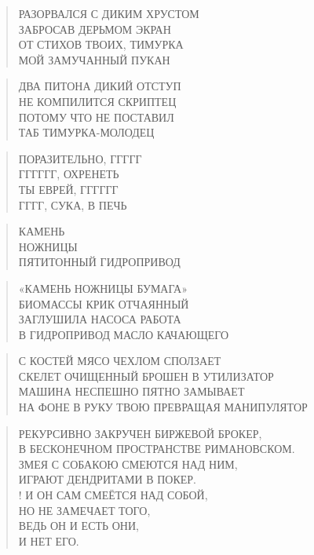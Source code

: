 \poemtitle{***}
\begin{verse}
РАЗОРВАЛСЯ С ДИКИМ ХРУСТОМ\\
ЗАБРОСАВ ДЕРЬМОМ ЭКРАН\\
ОТ СТИХОВ ТВОИХ, ТИМУРКА\\
МОЙ ЗАМУЧАННЫЙ ПУКАН
\end{verse}

\poemtitle{***}
\begin{verse}
ДВА ПИТОНА ДИКИЙ ОТСТУП\\
НЕ КОМПИЛИТСЯ СКРИПТЕЦ\\
ПОТОМУ ЧТО НЕ ПОСТАВИЛ\\
ТАБ ТИМУРКА-МОЛОДЕЦ
\end{verse}

\poemtitle{***}
\begin{verse}
ПОРАЗИТЕЛЬНО, ГГГГГ\\
ГГГГГГ, ОХРЕНЕТЬ\\
ТЫ ЕВРЕЙ, ГГГГГГ\\
ГГГГ, СУКА, В ПЕЧЬ
\end{verse}

\poemtitle{***}
\begin{verse}
КАМЕНЬ\\
НОЖНИЦЫ\\
ПЯТИТОННЫЙ ГИДРОПРИВОД
\end{verse}

\poemtitle{***}
\begin{verse}
«КАМЕНЬ НОЖНИЦЫ БУМАГА»\\
БИОМАССЫ КРИК ОТЧАЯННЫЙ\\
ЗАГЛУШИЛА НАСОСА РАБОТА\\
В ГИДРОПРИВОД МАСЛО КАЧАЮЩЕГО
\end{verse}

\poemtitle{***}
\begin{verse}
С КОСТЕЙ МЯСО ЧЕХЛОМ СПОЛЗАЕТ\\
СКЕЛЕТ ОЧИЩЕННЫЙ БРОШЕН В УТИЛИЗАТОР\\
МАШИНА НЕСПЕШНО ПЯТНО ЗАМЫВАЕТ\\
НА ФОНЕ В РУКУ ТВОЮ ПРЕВРАЩАЯ МАНИПУЛЯТОР
\end{verse}

\poemtitle{***}
\begin{verse}
РЕКУРСИВНО ЗАКРУЧЕН БИРЖЕВОЙ БРОКЕР,\\
В БЕСКОНЕЧНОМ ПРОСТРАНСТВЕ РИМАНОВСКОМ.\\
ЗМЕЯ С СОБАКОЮ СМЕЮТСЯ НАД НИМ,\\
ИГРАЮТ ДЕНДРИТАМИ В ПОКЕР.\\!
И ОН САМ СМЕЁТСЯ НАД СОБОЙ,\\
НО НЕ ЗАМЕЧАЕТ ТОГО,\\
ВЕДЬ ОН И ЕСТЬ ОНИ,\\
И НЕТ ЕГО.
\end{verse}

